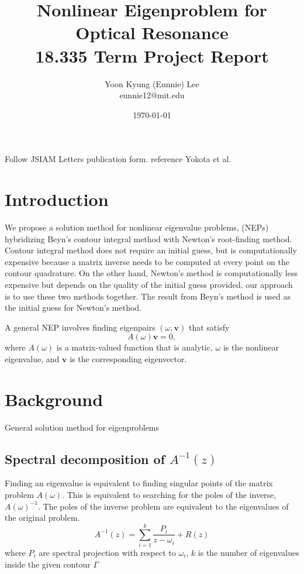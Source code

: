 \documentclass[11pt,letterpaper]{article}
\author{Yoon Kyung (Eunnie) Lee \\eunnie12@mit.edu}
\title{\textbf{Nonlinear Eigenproblem for Optical Resonance}\\18.335 Term Project Report}
\date{\today}
\begin{document}
\maketitle

\begin{multicols}{2}
Follow JSIAM Letters publication form. 
reference Yokota et al. 

\section{Introduction}
We propose a solution method for nonlinear eigenvalue problems, (NEPs) hybridizing Beyn's contour integral method\citep{beyn_integral_2012} with Newton's root-finding method. Contour integral method does not require an initial guess, but is computationally expensive because a matrix inverse needs to be computed at every point on the contour quadrature. On the other hand, Newton's method is computationally less expensive but depends on the quality of the initial guess provided. our approach is to use these two methods together. The result from Beyn's method is used as the initial guess for Newton's method. 

A general NEP involves finding eigenpairs $(\omega,\mathbf{v})$ that satisfy
\begin{equation}\label{eq:Eig}
    A(\omega) \mathbf{v} = 0,
\end{equation}
where $A(\omega)$ is a matrix-valued function that is analytic, $\omega$ is the nonlinear eigenvalue, and $\mathbf{v}$ is the corresponding eigenvector.

\section{Background}

General solution method for eigenproblems


\subsection{Spectral decomposition of $A^{-1}(z)$}
Finding an eigenvalue is equivalent to finding singular points of the matrix problem $A(\omega)$. This is equivalent to searching for the poles of the inverse, $A(\omega)^{-1}$. The poles of the inverse problem are equivalent to the eigenvalues of the original problem.
\begin{equation}\label{Keldish}
A^{-1}(z) = \sum\limits_{i=1}^{k}\frac{P_i}{z-\omega_i}+R(z)
\end{equation}
where $P_i$ are spectral projection with respect to $\omega_i$, $k$ is the number of eigenvalues inside the given contour $\Gamma$ 

\end{multicols}
\end{document}
